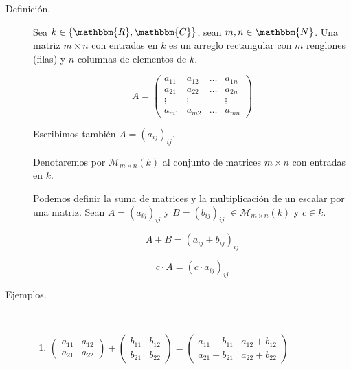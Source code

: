 \documentclass[12pt]{article}
\begin{document}
\begin{description}
\item [Definición.] Sea $k \in \{ \mathbbm{R}, \mathbbm{C} \}$, sean $m, n \in \mathbbm{N}$. Una matriz $m \times n$ con entradas en $k$ es un arreglo rectangular con $m$ renglones (filas) y $n$ columnas de elementos de $k$.

\begin{equation}
A = 
\begin{pmatrix}
a_{11} & a_{12} & \dots & a_{1n} \\
a_{21} & a_{22} & \dots & a_{2n} \\
\vdots & \vdots &       & \vdots \\
a_{m1} & a_{m2} & \dots & a_{mn}
\end{pmatrix}
\end{equation}

Escribimos también $A = (a_{ij})_{ij}$.

Denotaremos por $\mathcal{M}_{m \times n}(k)$ al conjunto de matrices $m \times n$ con entradas en $k$.

Podemos definir la suma de matrices y la multiplicación de un escalar por una matriz. Sean $A = (a_{ij})_{ij}$ y $B = (b_{ij})_{ij}$ $\in \mathcal{M}_{m \times n}(k)$ y $c \in k$.

\begin{equation}
A + B = (a_{ij} + b_{ij})_{ij}
\end{equation}

\begin{equation}
c \cdot A = (c \cdot a_{ij})_{ij}
\end{equation}

\item [Ejemplos.] \mbox{}\\

\begin{enumerate}
\item
\begin{math}
\begin{pmatrix}
a_{11} & a_{12} \\
a_{21} & a_{22}
\end{pmatrix}
+
\begin{pmatrix}
b_{11} & b_{12} \\
b_{21} & b_{22}
\end{pmatrix}
=
\begin{pmatrix}
a_{11} + b_{11} & a_{12} + b_{12} \\
a_{21} + b_{21} & a_{22} + b_{22}
\end{pmatrix}
\end{math}


\end{enumerate}
\end{description}
\end{document}
